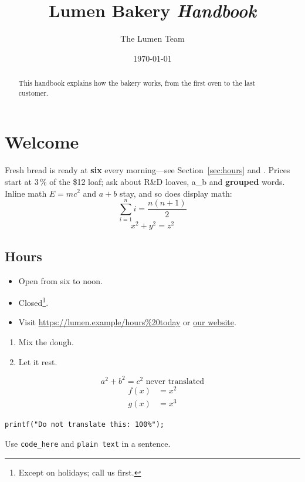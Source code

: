 ﻿\documentclass[11pt]{article}
\title{Lumen Bakery \emph{Handbook}}
\author{The Lumen Team}
\date{\today}
\begin{document}
\maketitle
\tableofcontents

\begin{abstract}
This handbook explains how the bakery works, from the first oven to the last customer.
\end{abstract}

\section{Welcome}\label{sec:welcome}
Fresh bread is ready at \textbf{six} every morning---see Section~\ref{sec:hours} and \cite[p.~3]{baker99}.
Prices start at 3\,\% of the \$12 loaf; ask about R\&D loaves, a\_b and {\bf grouped} words.
Inline math $E = mc^2$ and \(a+b\) stay, and so does display math:
\[ \sum_{i=1}^n i = \frac{n(n+1)}{2} \]
$$ x^2 + y^2 = z^2 $$

\subsection*{Hours}\label{sec:hours}
\begin{itemize}
  \item Open from six to noon.
  \item[Sundays] Closed\footnote{Except on holidays; call us first.}.
  \item Visit \url{https://lumen.example/hours%20today} or \href{https://lumen.example}{our website}.
\end{itemize}

\begin{enumerate}
  \item Mix the dough. %
  \item Let it rest.
\end{enumerate}

\begin{equation}
  a^2 + b^2 = c^2 \text{ never translated}
\end{equation}
\begin{align*}
  f(x) &= x^2 \\
  g(x) &= x^3
\end{align*}

\begin{verbatim}
printf("Do not translate this: 100%");
\end{verbatim}
Use \verb|code_here| and \texttt{plain text} in a sentence.
\end{document}
